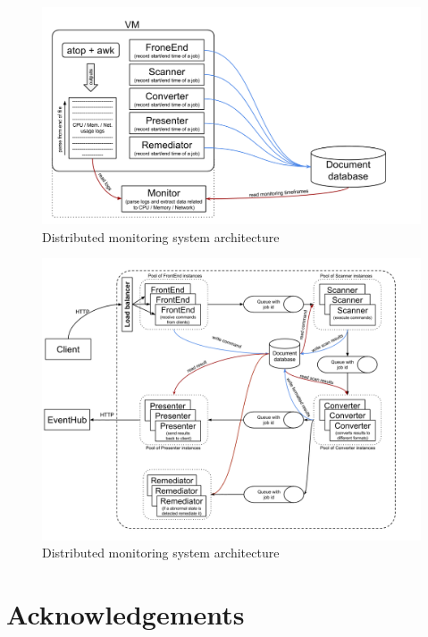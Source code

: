 \documentclass[fleqn,10pt]{./class/wlscirep}
\begin{document}
\begin{figure}[ht]
\centering
\includegraphics[width=\linewidth]{./img/MonitoringCPUMechanismExtended.png}
\caption{Distributed monitoring system architecture}
\label{fig:monitoringArchitectureExtended}
\end{figure}


\begin{figure}[ht]
\centering
\includegraphics[width=\linewidth]{./img/MonitoringSystemArchitectureRemediation.png}
\caption{Distributed monitoring system architecture}
\label{fig:systemArchitecture}
\end{figure}




\section*{Acknowledgements}
\end{document}
